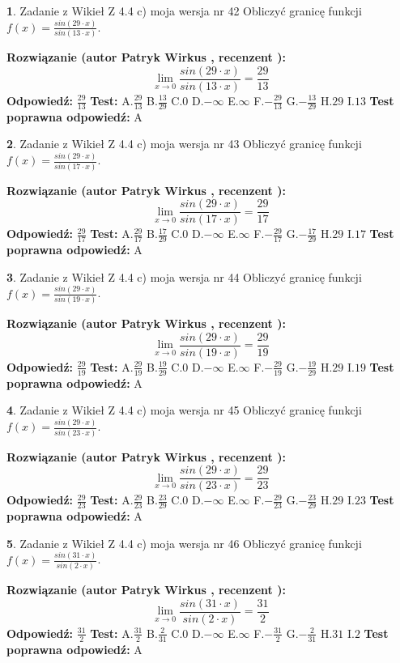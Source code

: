 \documentclass[12pt, a4paper]{article}
\theoremstyle{definition} %
\newtheorem{zad}{}
\newcommand{\zadStart}[1]{\begin{zad}#1\newline}
\newcommand{\zadStop}{\end{zad}}
\newcommand{\rozwStart}[2]{\noindent \textbf{Rozwiązanie (autor #1 , recenzent #2): }\newline}
\newcommand{\rozwStop}{\newline}
\newcommand{\odpStart}{\noindent \textbf{Odpowiedź:}\newline}
\newcommand{\odpStop}{\newline}
\newcommand{\testStart}{\noindent \textbf{Test:}\newline}
\newcommand{\testStop}{\newline}
\newcommand{\kluczStart}{\noindent \textbf{Test poprawna odpowiedź:}\newline}
\newcommand{\kluczStop}{\newline}
\begin{document}
\zadStart{Zadanie z Wikieł Z 4.4 c) moja wersja nr 42}
Obliczyć granicę funkcji $f(x)=\frac{sin(29\cdot x)}{sin(13\cdot x)}$.
\zadStop
\rozwStart{Patryk Wirkus}{}
$$\lim\limits_{x\to 0}\frac{sin(29\cdot x)}{sin(13\cdot x)}=
\frac{29}{13}$$
\rozwStop
\odpStart
$\frac{29}{13}$
\odpStop
\testStart
A.$\frac{29}{13}$
B.$\frac{13}{29}$
C.$0$
D.$-\infty$
E.$\infty$
F.$-\frac{29}{13}$
G.$-\frac{13}{29}$
H.$29$
I.$13$
\testStop
\kluczStart
A
\kluczStop



\zadStart{Zadanie z Wikieł Z 4.4 c) moja wersja nr 43}
Obliczyć granicę funkcji $f(x)=\frac{sin(29\cdot x)}{sin(17\cdot x)}$.
\zadStop
\rozwStart{Patryk Wirkus}{}
$$\lim\limits_{x\to 0}\frac{sin(29\cdot x)}{sin(17\cdot x)}=
\frac{29}{17}$$
\rozwStop
\odpStart
$\frac{29}{17}$
\odpStop
\testStart
A.$\frac{29}{17}$
B.$\frac{17}{29}$
C.$0$
D.$-\infty$
E.$\infty$
F.$-\frac{29}{17}$
G.$-\frac{17}{29}$
H.$29$
I.$17$
\testStop
\kluczStart
A
\kluczStop



\zadStart{Zadanie z Wikieł Z 4.4 c) moja wersja nr 44}
Obliczyć granicę funkcji $f(x)=\frac{sin(29\cdot x)}{sin(19\cdot x)}$.
\zadStop
\rozwStart{Patryk Wirkus}{}
$$\lim\limits_{x\to 0}\frac{sin(29\cdot x)}{sin(19\cdot x)}=
\frac{29}{19}$$
\rozwStop
\odpStart
$\frac{29}{19}$
\odpStop
\testStart
A.$\frac{29}{19}$
B.$\frac{19}{29}$
C.$0$
D.$-\infty$
E.$\infty$
F.$-\frac{29}{19}$
G.$-\frac{19}{29}$
H.$29$
I.$19$
\testStop
\kluczStart
A
\kluczStop



\zadStart{Zadanie z Wikieł Z 4.4 c) moja wersja nr 45}
Obliczyć granicę funkcji $f(x)=\frac{sin(29\cdot x)}{sin(23\cdot x)}$.
\zadStop
\rozwStart{Patryk Wirkus}{}
$$\lim\limits_{x\to 0}\frac{sin(29\cdot x)}{sin(23\cdot x)}=
\frac{29}{23}$$
\rozwStop
\odpStart
$\frac{29}{23}$
\odpStop
\testStart
A.$\frac{29}{23}$
B.$\frac{23}{29}$
C.$0$
D.$-\infty$
E.$\infty$
F.$-\frac{29}{23}$
G.$-\frac{23}{29}$
H.$29$
I.$23$
\testStop
\kluczStart
A
\kluczStop



\zadStart{Zadanie z Wikieł Z 4.4 c) moja wersja nr 46}
Obliczyć granicę funkcji $f(x)=\frac{sin(31\cdot x)}{sin(2\cdot x)}$.
\zadStop
\rozwStart{Patryk Wirkus}{}
$$\lim\limits_{x\to 0}\frac{sin(31\cdot x)}{sin(2\cdot x)}=
\frac{31}{2}$$
\rozwStop
\odpStart
$\frac{31}{2}$
\odpStop
\testStart
A.$\frac{31}{2}$
B.$\frac{2}{31}$
C.$0$
D.$-\infty$
E.$\infty$
F.$-\frac{31}{2}$
G.$-\frac{2}{31}$
H.$31$
I.$2$
\testStop
\kluczStart
A
\kluczStop
\end{document}

